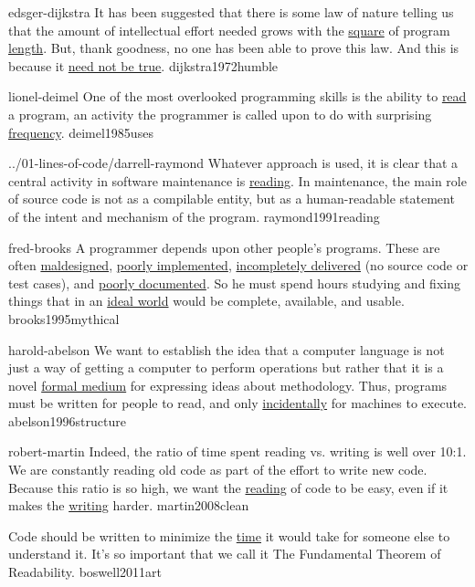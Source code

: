 \documentclass{article}
\begin{document}


\lnQuote
  {edsger-dijkstra}
  {It has been suggested that there is some law of nature telling us that the amount of intellectual effort needed grows with the \ul{square} of program \ul{length}. But, thank goodness, no one has been able to prove this law. And this is because it \ul{need not be true}.}
  {dijkstra1972humble}

\lnQuote
  {lionel-deimel}
  {One of the most overlooked programming skills is the ability to \ul{read} a program, an activity the programmer is called upon to do with surprising \ul{frequency}.}
  {deimel1985uses}

\lnQuote
  {../01-lines-of-code/darrell-raymond}
  {Whatever approach is used, it is clear that a central activity in software maintenance is \ul{reading}. In maintenance, the main role of source code is not as a compilable entity, but as a human-readable statement of the intent and mechanism of the program.}
  {raymond1991reading}

\lnQuote
  {fred-brooks}
  {A programmer depends upon other people's programs. These are often \ul{maldesigned}, \ul{poorly implemented}, \ul{incompletely delivered} (no source code or test cases), and \ul{poorly documented}. So he must spend hours studying and fixing things that in an \ul{ideal world} would be complete, available, and usable.}
  {brooks1995mythical}

\lnQuote
  {harold-abelson}
  {We want to establish the idea that a computer language is not just a way of getting a computer to perform operations but rather that it is a novel \ul{formal medium} for expressing ideas about methodology. Thus, programs must be written for people to read, and only \ul{incidentally} for machines to execute.}
  {abelson1996structure}

\lnQuote
  {robert-martin}
  {Indeed, the ratio of time spent reading vs. writing is well over 10:1. We are constantly reading old code as part of the effort to write new code. Because this ratio is so high, we want the \ul{reading} of code to be easy, even if it makes the \ul{writing} harder.}
  {martin2008clean}

  {Code should be written to minimize the \ul{time} it would take for someone else to understand it. It's so important that we call it The Fundamental Theorem of Readability.}
  {boswell2011art}
\end{document}
